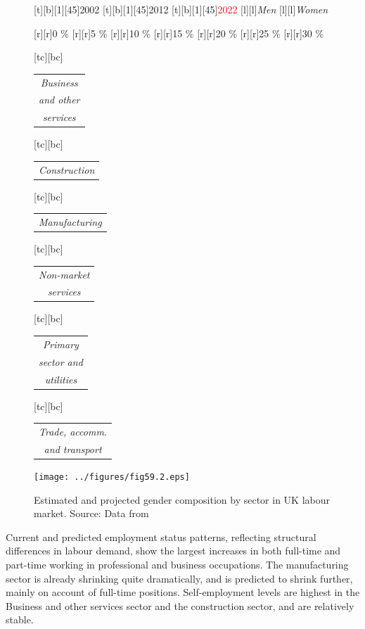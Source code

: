 \documentclass[11 pt, a4paper]{report}
\renewcommand{\arraystretch}{1.2}
\begin{document}
\begin{figure}[hbtp!]
[t][b][1][45]{\small{2002}}
[t][b][1][45]{\small{2012}}
[t][b][1][45]{\small{\textcolor{red}{2022}}}
[l][l]{\scriptsize{\emph{Men}}}
[l][l]{\scriptsize{\emph{Women}}}


[r][r]{\scriptsize{0 \%}}
[r][r]{\scriptsize{5 \%}}
[r][r]{\scriptsize{10 \%}}
[r][r]{\scriptsize{15 \%}}
[r][r]{\scriptsize{20 \%}}
[r][r]{\scriptsize{25 \%}}
[r][r]{\scriptsize{30 \%}}

\renewcommand{\arraystretch}{0.7}
[tc][bc]{\scriptsize{
\begin{tabular}{c}
\emph{Business}\\
\emph{and other }\\
\emph{services}
\end{tabular}
}}
[tc][bc]{\scriptsize{
\begin{tabular}{c}
\emph{Construction}
\end{tabular}
}}
[tc][bc]{\scriptsize{
\begin{tabular}{c}
\emph{Manufacturing}
\end{tabular}
}}

[tc][bc]{\scriptsize{
\begin{tabular}{c}
\emph{Non-market}\\
\emph{services}
\end{tabular}
}}
[tc][bc]{\scriptsize{
\begin{tabular}{c}
\emph{Primary }\\
\emph{sector and }\\
\emph{utilities}
\end{tabular}
}}
[tc][bc]{\scriptsize{
\begin{tabular}{c}
\emph{Trade, accomm.}\\
\emph{and transport}
\end{tabular}
}}
\centering
\texttt{[image: ../figures/fig59.2.eps]}
\caption{Estimated and projected gender composition by sector in UK labour market. Source: Data from \citet{Wilson2014} }\label{Fig:592}
\end{figure}

Current and predicted employment status patterns, reflecting structural differences in labour demand, show the largest increases in both full-time and part-time working in professional and business occupations. The manufacturing sector is already shrinking quite dramatically, and is predicted to shrink further, mainly on account of full-time positions. Self-employment levels are highest in the Business and other services sector and the construction sector,  and are relatively stable. 
\end{document}

